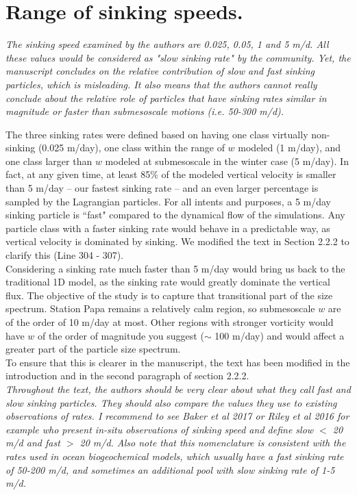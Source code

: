 \documentclass[12pt,letter]{article}
\begin{document}
\section*{Range of sinking speeds.}
\textit{The sinking speed examined by the authors are 0.025, 0.05, 1 and 5 m/d. All these values would be considered as "slow sinking rate" by the community. Yet, the manuscript concludes on the relative contribution of slow and fast sinking particles, which is misleading. It also means that the authors cannot really conclude about the relative role of particles that have sinking rates similar in magnitude or faster than submesoscale motions (i.e. 50-300 m/d).\\}

The three sinking rates were defined based on having one class virtually non-sinking (0.025 m/day), one class within the range of $w$ modeled (1 m/day), and one class larger than $w$ modeled at submesoscale in the winter case (5 m/day). In fact, at any given time, at least 85\% of the modeled vertical velocity is smaller than 5 m/day -- our fastest sinking rate -- and an even larger percentage is sampled by the Lagrangian particles. For all intents and purposes, a 5 m/day sinking particle is ``fast" compared to the dynamical flow of the simulations. Any particle class with a faster sinking rate would behave in a predictable way, as vertical velocity is dominated by sinking. We modified the text in Section 2.2.2 to clarify this (Line 304 - 307).\\

Considering a sinking rate much faster than 5 m/day would bring us back to the traditional 1D model, as the sinking rate would greatly dominate the vertical flux. The objective of the study is to capture that transitional part of the size spectrum. Station Papa remains a relatively calm region, so submesoscale $w$ are of the order of 10 m/day at most. Other regions with stronger vorticity would have $w$ of the order of magnitude you suggest ($\sim$ 100 m/day) and would affect a greater part of the particle size spectrum.\\

To ensure that this is clearer in the manuscript, the text has been modified in the introduction and in the second paragraph of section 2.2.2.\\

\textit{Throughout the text, the authors should be very clear about what they call fast and slow sinking particles. They should also compare the values they use to existing observations of rates. I recommend to see Baker et al 2017 or Riley et al 2016 for example who present in-situ observations of sinking speed and define slow $<$ 20 m/d and fast $>$ 20 m/d. Also note that this nomenclature is consistent with the rates used in ocean biogeochemical models, which usually have a fast sinking rate of 50-200 m/d, and sometimes an additional pool with slow sinking rate of 1-5 m/d.\\}
\end{document}
